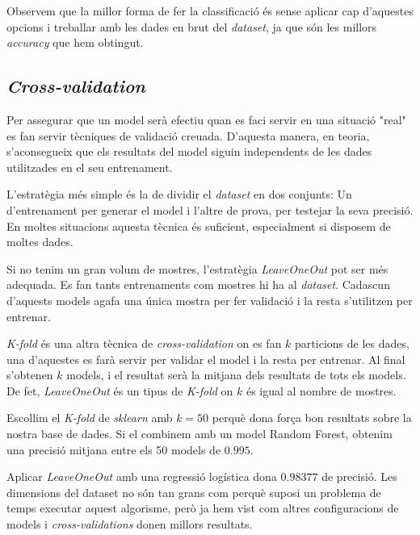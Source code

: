 \documentclass[a4paper, 11pt]{article}
\begin{document}
        Observem que la millor forma de fer la classificació és sense aplicar cap d'aquestes opcions i treballar amb les dades en brut del \textit{dataset}, ja que són les millors \textit{accuracy} que hem obtingut.

        \subsection{\textit{Cross-validation}}
        Per assegurar que un model serà efectiu quan es faci servir en una situació "real" es fan servir tècniques de validació creuada. D'aquesta manera, en teoria, s'aconsegueix que els resultats del model siguin independents de les dades utilitzades en el seu entrenament.

        L'estratègia més simple és la de dividir el \textit{dataset} en dos conjunts: Un d'entrenament per generar el model i l'altre de prova, per testejar la seva precisió. En moltes situacions aquesta tècnica és suficient, especialment si disposem de moltes dades.

        Si no tenim un gran volum de mostres, l'estratègia \textit{LeaveOneOut} pot ser més adequada. Es fan tants entrenaments com mostres hi ha al \textit{dataset}. Cadascun d'aquests models agafa una única mostra per fer validació i la resta s'utilitzen per entrenar.

        \textit{K-fold} és una altra tècnica de \textit{cross-validation} on es fan $k$ particions de les dades, una d'aquestes es farà servir per validar el model i la resta per entrenar. Al final s'obtenen $k$ models, i el resultat serà la mitjana dels resultats de tots els models. De fet, \textit{LeaveOneOut} és un tipus de \textit{K-fold} on $k$ és igual al nombre de mostres.

        Escollim el \textit{K-fold} de \textit{sklearn} amb $k=50$ perquè dona força bon resultats sobre la nostra base de dades. Si el combinem amb un model Random Forest, obtenim una precisió mitjana entre els 50 models de $0.995$.

        Aplicar \textit{LeaveOneOut} amb una regressió logística dona $0.98377$ de precisió. Les dimensions del dataset no són tan grans com perquè suposi un problema de temps executar aquest algorisme, però ja hem vist com altres configuracions de models i \textit{cross-validations} donen millors resultats.
\end{document}
